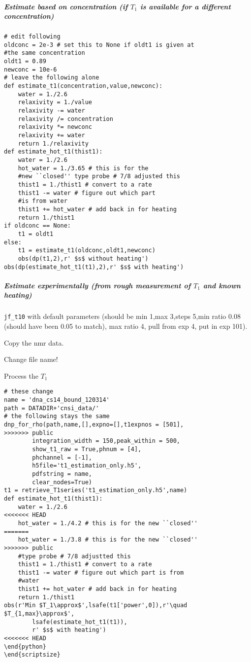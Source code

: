 \begin{scriptsize}
\begin{python}[off]
\subparagraph{Estimate based on concentration {\tiny (if $T_1$ is available for a different concentration)}}

\begin{lstlisting}
# edit following
oldconc = 2e-3 # set this to None if oldt1 is given at
#the same concentration
oldt1 = 0.89
newconc = 10e-6
# leave the following alone
def estimate_t1(concentration,value,newconc):
    water = 1./2.6
    relaxivity = 1./value
    relaxivity -= water
    relaxivity /= concentration
    relaxivity *= newconc
    relaxivity += water
    return 1./relaxivity
def estimate_hot_t1(thist1):
    water = 1./2.6
    hot_water = 1./3.65 # this is for the
    #new ``closed'' type probe # 7/8 adjusted this
    thist1 = 1./thist1 # convert to a rate
    thist1 -= water # figure out which part
    #is from water
    thist1 += hot_water # add back in for heating
    return 1./thist1
if oldconc == None:
    t1 = oldt1
else:
    t1 = estimate_t1(oldconc,oldt1,newconc)
    obs(dp(t1,2),r' $s$ without heating')
obs(dp(estimate_hot_t1(t1),2),r' $s$ with heating')
\end{lstlisting}

\subparagraph{Estimate experimentally (from rough measurement of $T_1$ and known heating)}
\texttt{jf\_t10} with default parameters (should be min 1,max 3,steps 5,min ratio 0.08 (should have been 0.05 to match), max ratio 4, pull from exp 4, put in exp 101).

Copy the nmr data.

Change file name!

Process the $T_1$


\begin{scriptsize}
\begin{lstlisting}
# these change
name = 'dna_cs14_bound_120314'
path = DATADIR+'cnsi_data/'
# the following stays the same
dnp_for_rho(path,name,[],expno=[],t1expnos = [501],
>>>>>>> public
        integration_width = 150,peak_within = 500,
        show_t1_raw = True,phnum = [4],
        phchannel = [-1],
        h5file='t1_estimation_only.h5',
        pdfstring = name,
        clear_nodes=True)
t1 = retrieve_T1series('t1_estimation_only.h5',name)
def estimate_hot_t1(thist1):
    water = 1./2.6
<<<<<<< HEAD
    hot_water = 1./4.2 # this is for the new ``closed''
=======
    hot_water = 1./3.8 # this is for the new ``closed''
>>>>>>> public
    #type probe # 7/8 adjustted this
    thist1 = 1./thist1 # convert to a rate
    thist1 -= water # figure out which part is from
    #water
    thist1 += hot_water # add back in for heating
    return 1./thist1
obs(r'Min $T_1\approx$',lsafe(t1['power',0]),r'\quad $T_{1,max}\approx$',
        lsafe(estimate_hot_t1(t1)),
        r' $s$ with heating')
<<<<<<< HEAD
\end{python}
\end{scriptsize}

\end{lstlisting}
\end{scriptsize}
\end{python}
\end{scriptsize}
